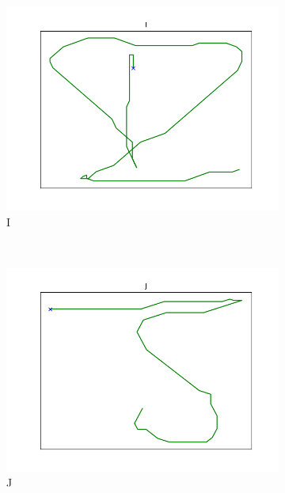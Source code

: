 \begin{figure}
\begin{subfigure}[b]{0.14\textwidth}
        \includegraphics[width=\textwidth]{images/gbem/orig_letters_fig/AORIG_letter_I_writer_5.png}
        \caption{I}
    \end{subfigure}
    ~
    \begin{subfigure}[b]{0.14\textwidth}
        \includegraphics[width=\textwidth]{images/gbem/orig_letters_fig/AORIG_letter_J_writer_4.png}
        \caption{J}
    \end{subfigure}
    ~
    \begin{subfigure}[b]{0.14\textwidth}

\end{subfigure}
\end{figure}

